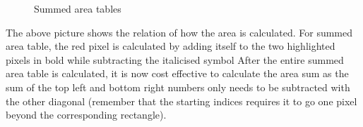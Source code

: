 \documentclass[twoside,a4paper,article]{combine}
\begin{document}
\begin{minipage}{\textwidth}\begin{figure}[H]
    \centering
    \caption{Summed area tables\cite{Szeliski_2022}}
    \label{fig:graph}
\end{figure}\end{minipage}
The above picture shows the relation of how the area is calculated. For summed area table, the red pixel is calculated by adding itself to the
two highlighted pixels in bold while subtracting the italicised symbol After the entire summed area table is calculated, it is now
cost effective to calculate the area sum as the sum of the top left and bottom right numbers only needs to be subtracted with the other diagonal (remember that
the starting indices requires it to go one pixel beyond the corresponding rectangle).
\end{document}

